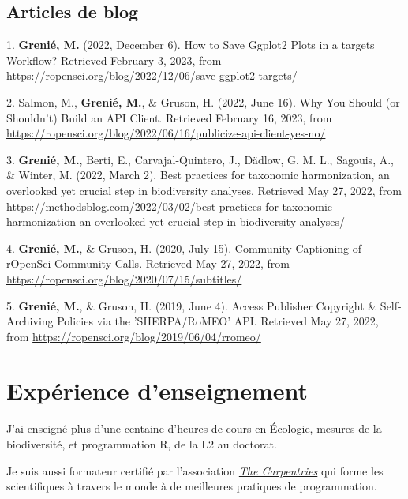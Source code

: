 \documentclass[10pt,a4paper,]{article}
\begin{document}
\hypertarget{articles-de-blog}{%
\subsection{Articles de blog}\label{articles-de-blog}}

\hypertarget{bibliography}{}
\leavevmode{}%
1. \textbf{Grenié, M.} (2022, December 6). How to Save Ggplot2 Plots in
a targets Workflow? Retrieved February 3, 2023, from
\url{https://ropensci.org/blog/2022/12/06/save-ggplot2-targets/}

\leavevmode{}%
2. Salmon, M., \textbf{Grenié, M.}, \& Gruson, H. (2022, June 16). Why
You Should (or Shouldn't) Build an API Client. Retrieved February 16,
2023, from
\url{https://ropensci.org/blog/2022/06/16/publicize-api-client-yes-no/}

\leavevmode{}%
3. \textbf{Grenié, M.}, Berti, E., Carvajal-Quintero, J., Dädlow, G. M.
L., Sagouis, A., \& Winter, M. (2022, March 2). Best practices for
taxonomic harmonization, an overlooked yet crucial step in biodiversity
analyses. Retrieved May 27, 2022, from
\url{https://methodsblog.com/2022/03/02/best-practices-for-taxonomic-harmonization-an-overlooked-yet-crucial-step-in-biodiversity-analyses/}

\leavevmode{}%
4. \textbf{Grenié, M.}, \& Gruson, H. (2020, July 15). Community
Captioning of rOpenSci Community Calls. Retrieved May 27, 2022, from
\url{https://ropensci.org/blog/2020/07/15/subtitles/}

\leavevmode{}%
5. \textbf{Grenié, M.}, \& Gruson, H. (2019, June 4). Access Publisher
Copyright \& Self-Archiving Policies via the 'SHERPA/RoMEO' API.
Retrieved May 27, 2022, from
\url{https://ropensci.org/blog/2019/06/04/rromeo/}

\hypertarget{expuxe9rience-denseignement}{%
\section{Expérience d'enseignement}\label{expuxe9rience-denseignement}}

J'ai enseigné plus d'une centaine d'heures de cours en Écologie, mesures
de la biodiversité, et programmation R, de la L2 au doctorat.

Je suis aussi formateur certifié par l'association
\href{https://carpentries.org/}{\emph{The Carpentries}} qui forme les
scientifiques à travers le monde à de meilleures pratiques de
programmation.
\end{document}

